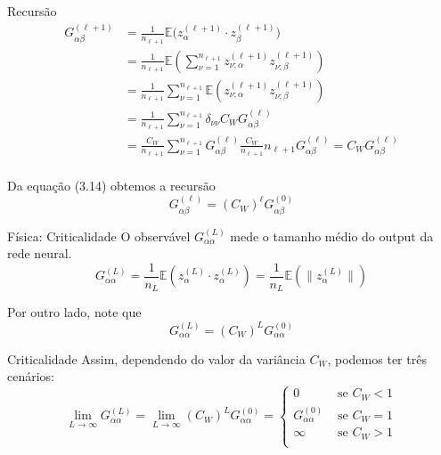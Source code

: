 \documentclass{beamer}
\newcommand{\EE}{\mathbb{E}}
\newcommand{\aaA}{\alpha}
\newcommand{\aaB}{\beta}
\begin{document}
\begin{frame}{Recursão}
	\begin{align*}\tag{3.14}
		G^{(\ell+1)}_{\aaA\aaB} &= \frac{1}{n_{\ell+1}}\EE\big(z^{(\ell+1)}_{\aaA}\cdot z^{(\ell+1)}_{\aaB}\big) \\
		&= \frac{1}{n_{\ell+1}}\EE\left(\sum_{\nu=1}^{n_{\ell+1}}z^{(\ell+1)}_{\nu;\aaA} z^{(\ell+1)}_{\nu;\aaB}\right) \\
		&= \frac{1}{n_{\ell+1}}\sum_{\nu=1}^{n_{\ell+1}} \EE\left(z^{(\ell+1)}_{\nu;\aaA} z^{(\ell+1)}_{\nu;\aaB}\right) \\
		&= \frac{1}{n_{\ell+1}}\sum_{\nu=1}^{n_{\ell+1}} \delta_{\nu\nu}C_WG^{(\ell)}_{\aaA\aaB} \\
		&= \frac{C_W}{n_{\ell+1}}\sum_{\nu=1}^{n_{\ell+1}} G^{(\ell)}_{\aaA\aaB}\frac{C_W}{n_{\ell+1}}n_{\ell+1}G^{(\ell)}_{\aaA\aaB} = C_WG^{(\ell)}_{\aaA\aaB}\\ 
	\end{align*}
\end{frame}

\begin{frame}
	Da equação (3.14) obtemos a recursão
	\begin{equation*}\tag{3.15}
		G^{(\ell)}_{\aaA\aaB} = (C_W)^{\ell}G^{(0)}_{\aaA\aaB}
	\end{equation*}
\end{frame}

\begin{frame}{Física: Criticalidade}
	O observável $G^{(L)}_{\aaA\aaA}$ mede o tamanho médio do output da rede neural.
	\begin{equation*}\tag{3.16}
		G^{(L)}_{\aaA\aaA} = \frac{1}{n_L}\EE\left(z^{(L)}_\aaA\cdot z^{(L)}_\aaA\right) =  \frac{1}{n_L}\EE\left(\big\|z^{(L)}_\aaA\big\|\right)
	\end{equation*}

	Por outro lado, note que 
	$$G^{(L)}_{\aaA\aaA} = (C_W)^LG^{(0)}_{\aaA\aaA}$$
\end{frame}

\begin{frame}{Criticalidade}
	Assim, dependendo do valor da variância $C_W$, podemos ter três cenários:
	\begin{equation*}
		\lim_{L\to\infty} G^{(L)}_{\aaA\aaA} = \lim_{L\to\infty} (C_W)^LG^{(0)}_{\aaA\aaA} =
	\begin{cases}
		0  &\text{ se } C_W < 1  \\
		G^{(0)}_{\aaA\aaA}&\text{ se }  C_W = 1 \\
		\infty &\text{ se  } C_W>1\\
	\end{cases}
	\end{equation*}
\end{frame}
\end{document}
